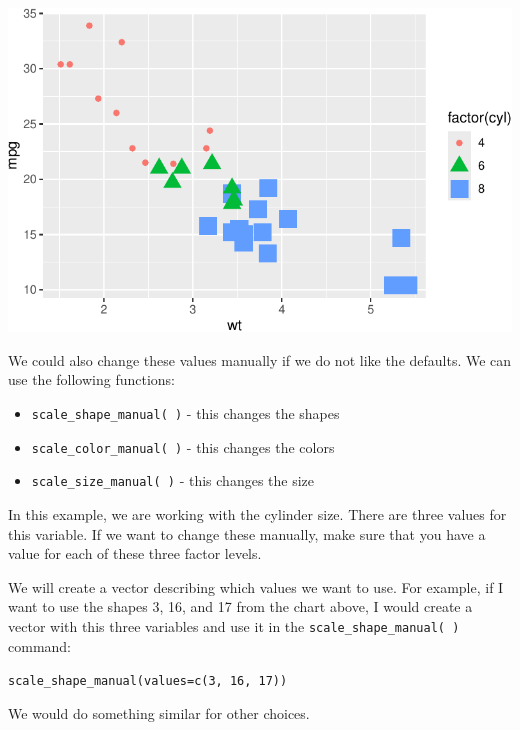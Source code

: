 \documentclass[
  letterpaper,
  DIV=11,
  numbers=noendperiod]{scrreprt}
\providecommand{\tightlist}{%
  \setlength{\itemsep}{0pt}\setlength{\parskip}{0pt}}\usepackage{longtable,booktabs,array}
\begin{document}
\includegraphics{Advanced_Scatterplot_Techniques_files/figure-pdf/unnamed-chunk-11-1.pdf}

We could also change these values manually if we do not like the
defaults. We can use the following functions:

\begin{itemize}
\tightlist
\item
  \texttt{scale\_shape\_manual(\ )} - this changes the shapes
\item
  \texttt{scale\_color\_manual(\ )} - this changes the colors
\item
  \texttt{scale\_size\_manual(\ )} - this changes the size
\end{itemize}

In this example, we are working with the cylinder size. There are three
values for this variable. If we want to change these manually, make sure
that you have a value for each of these three factor levels.

We will create a vector describing which values we want to use. For
example, if I want to use the shapes 3, 16, and 17 from the chart above,
I would create a vector with this three variables and use it in the
\texttt{scale\_shape\_manual(\ )} command:

\texttt{scale\_shape\_manual(values=c(3,\ 16,\ 17))}

We would do something similar for other choices.
\end{document}
